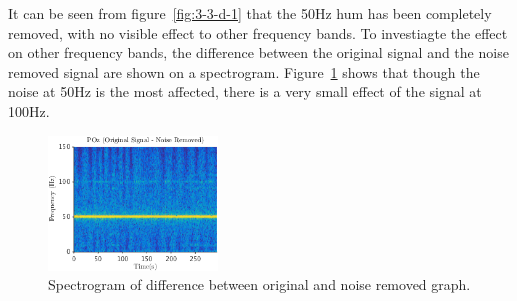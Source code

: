\documentclass[main.tex]{subfiles}
\begin{document}
It can be seen from figure~\ref{fig:3-3-d-1} that the 50Hz hum has been completely removed, with no visible effect to other frequency bands. To investiagte the effect on other frequency bands, the difference between the original signal and the noise removed signal are shown on a spectrogram. Figure~\ref{fig:3-3-d-2} shows that though the noise at 50Hz is the most affected, there is a very small effect of the signal at 100Hz.

\begin{figure}[H]
	\centering
	\includegraphics[width=0.4\textwidth]{images/3-3-d-2.png}
	\caption{Spectrogram of difference between original and noise removed graph.}
	\label{fig:3-3-d-2}
\end{figure}
\end{document}
